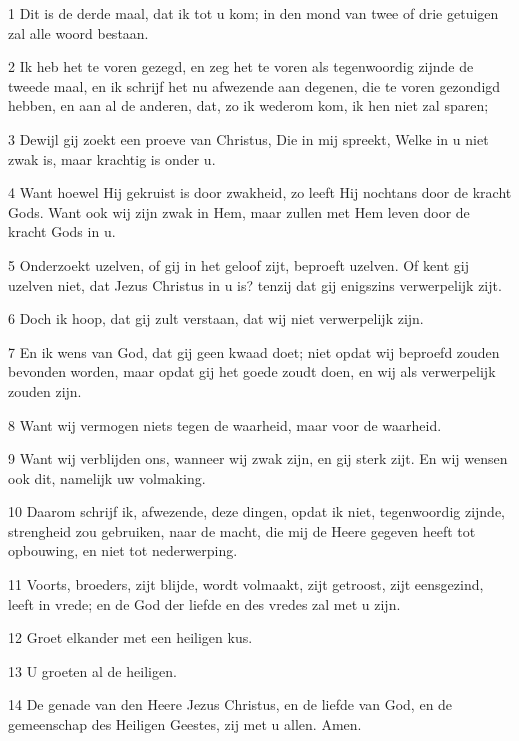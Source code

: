 \par 1 Dit is de derde maal, dat ik tot u kom; in den mond van twee of drie getuigen zal alle woord bestaan.
\par 2 Ik heb het te voren gezegd, en zeg het te voren als tegenwoordig zijnde de tweede maal, en ik schrijf het nu afwezende aan degenen, die te voren gezondigd hebben, en aan al de anderen, dat, zo ik wederom kom, ik hen niet zal sparen;
\par 3 Dewijl gij zoekt een proeve van Christus, Die in mij spreekt, Welke in u niet zwak is, maar krachtig is onder u.
\par 4 Want hoewel Hij gekruist is door zwakheid, zo leeft Hij nochtans door de kracht Gods. Want ook wij zijn zwak in Hem, maar zullen met Hem leven door de kracht Gods in u.
\par 5 Onderzoekt uzelven, of gij in het geloof zijt, beproeft uzelven. Of kent gij uzelven niet, dat Jezus Christus in u is? tenzij dat gij enigszins verwerpelijk zijt.
\par 6 Doch ik hoop, dat gij zult verstaan, dat wij niet verwerpelijk zijn.
\par 7 En ik wens van God, dat gij geen kwaad doet; niet opdat wij beproefd zouden bevonden worden, maar opdat gij het goede zoudt doen, en wij als verwerpelijk zouden zijn.
\par 8 Want wij vermogen niets tegen de waarheid, maar voor de waarheid.
\par 9 Want wij verblijden ons, wanneer wij zwak zijn, en gij sterk zijt. En wij wensen ook dit, namelijk uw volmaking.
\par 10 Daarom schrijf ik, afwezende, deze dingen, opdat ik niet, tegenwoordig zijnde, strengheid zou gebruiken, naar de macht, die mij de Heere gegeven heeft tot opbouwing, en niet tot nederwerping.
\par 11 Voorts, broeders, zijt blijde, wordt volmaakt, zijt getroost, zijt eensgezind, leeft in vrede; en de God der liefde en des vredes zal met u zijn.
\par 12 Groet elkander met een heiligen kus.
\par 13 U groeten al de heiligen.
\par 14 De genade van den Heere Jezus Christus, en de liefde van God, en de gemeenschap des Heiligen Geestes, zij met u allen. Amen.




